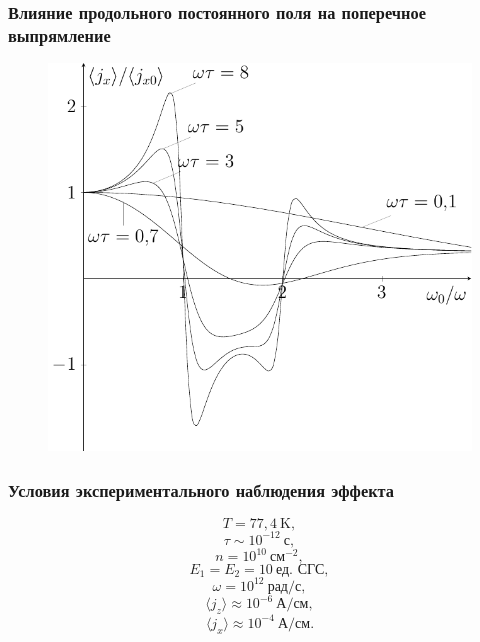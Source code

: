 \documentclass[10pt,pdf,intlimits]{beamer}
\begin{document}
  \begin{frame}
    \frametitle{Влияние продольного постоянного поля на поперечное выпрямление}
        \begin{figure}[h]
          \center
          \includegraphics[height=.8\textheight]{../figures/jx.pdf}
      \end{figure}
  \end{frame}
  \begin{frame}
      \frametitle{Условия экспериментального наблюдения эффекта}
      \begin{equation}
          T = 77,\!4~\text{K},
      \end{equation}
      \begin{equation}
          \tau \sim 10^{-12}~\text{с},
      \end{equation}
      \begin{equation}
          n = 10^{10}~\text{см}^{-2},
      \end{equation}
      \begin{equation}
          E_1 = E_2 = 10~\text{ед. СГС},
      \end{equation}
      \begin{equation}
          \omega = 10^{12}~\text{рад}/\text{с},
      \end{equation}
      \begin{equation}
         \langle j_z \rangle \approx 10^{-6}~\text{А}/\text{см},
      \end{equation}
      \begin{equation}
          \langle j_x \rangle \approx 10^{-4}~\text{А}/\text{см}.
      \end{equation}
  \end{frame}
\end{document}
